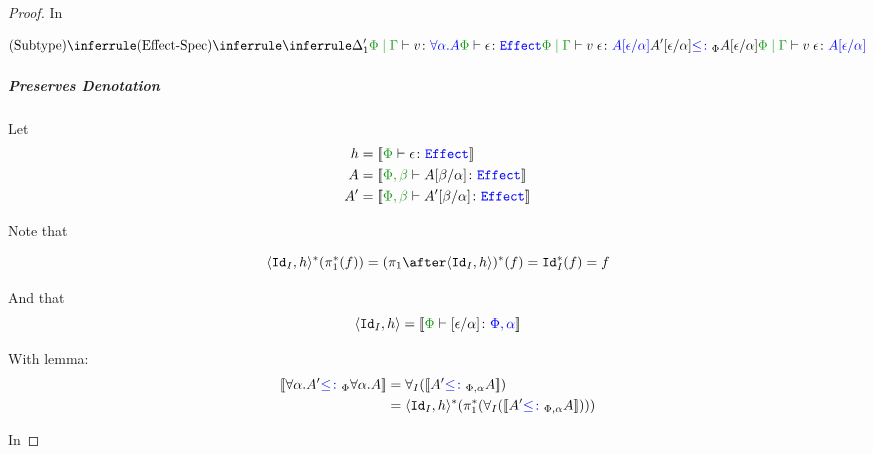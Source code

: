 \documentclass{report}
\begin{document}
\begin{framed}
\begin{proof}
                In
        
                \begin{equation}
                    \ntreeruleII{\vsubtype}{
                        \ntreeruleII{\vspec}{
                            \treeruleI{\D_1'}{\gpetyperelation{v}{\all{\a}{A}}}}{\wellformede{\P}{\e}
                        }{\gpetyperelation{\eapp{v}{\e}}{A\ssub{\a}{\e}}}
                    }{
                    A'\ssub{\a}{\e}\subtypep A\ssub{\a}{\e}
                    }{
                        \gpetyperelation{\eapp{v}{\e}}{A\ssub{\a}{\e}}
                    }
                \end{equation}
        
                \subparagraph{Preserves Denotation}
                Let
                \begin{align*}
                    h &= \deno{\typerelation{\P}{\e}{\effect}}\\
                    A & = \deno{\typerelation{\P,\b}{A\ssub{\a}{\b}}{\effect}}\\
                    A' & = \deno{\typerelation{\P,\b}{A'\ssub{\a}{\b}}{\effect}}
                \end{align*}
        
                Note that 
        
                \begin{equation}
                    \pr{\Id{I}}{h}\star(\pstar(f)) = (\p\after\pr{\Id{I}}{h})\star(f) = \Id{I}\star(f) = f
                \end{equation}
        
                And that 
                \begin{equation}
                    \pr{\Id{I}}{h} = \deno{\typerelation{\P}{\ssub{\a}{\e}}{\P,\a}}
                \end{equation}
        
                With lemma:
                \begin{align*}
                    {\bf [\![}\forall \alpha. A'{\color{blue} \leq\colon}_\Phi{\forall \alpha. A}{\bf ]\!]} & = \forall_I({\bf [\![}A' {\color{blue} \leq\colon}_{\Phi, \alpha} A{\bf ]\!]})\\
                    & = \langle\texttt{Id}_{I}, h\rangle^*(\pi_1^*(\forall_I({\bf [\![}A' {\color{blue} \leq\colon}_{\Phi, \alpha} A{\bf ]\!]})))
                \end{align*}
        
                In
        

\end{proof}
\end{framed}
\end{document}
